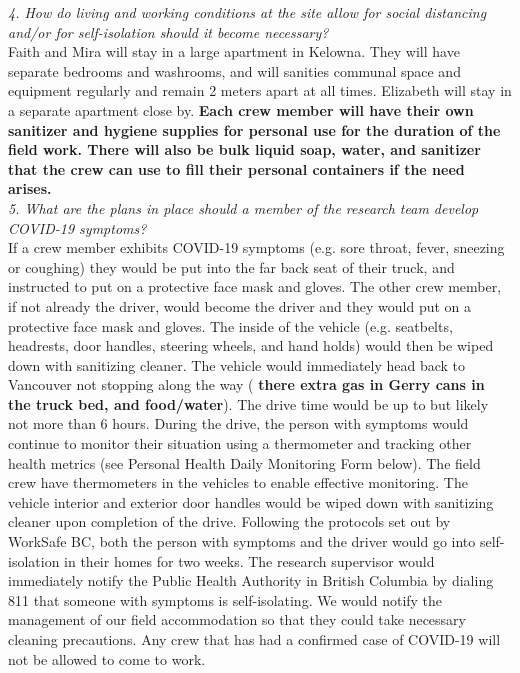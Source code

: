 \documentclass[11pt,letter]{article}
\begin{document}
\emph{4. How do living and working conditions at the site allow for social distancing and/or for self-isolation should it become necessary?}\\
Faith and Mira will stay in a large apartment in Kelowna. They will have separate bedrooms and washrooms, and will sanities communal space and equipment regularly and remain 2 meters apart at all times. Elizabeth will stay in a separate apartment close by.  \textbf{Each crew member will have their own sanitizer and hygiene supplies for personal use for the duration of the field work. There will also be bulk liquid soap, water, and sanitizer that the crew can use to fill their personal containers if the need arises.}\\

\emph{5. What are the plans in place should a member of the research team develop COVID-19 symptoms?}\\
If a crew member exhibits COVID-19 symptoms (e.g. sore throat, fever, sneezing or coughing) they would be put into the far back seat of their truck, and instructed to put on a protective face mask and gloves. The other crew member, if not already the driver, would become the driver and they would put on a protective face mask and gloves. The inside of the vehicle (e.g. seatbelts, headrests, door handles, steering wheels, and hand holds) would then be wiped down with sanitizing cleaner. The vehicle would immediately head back to Vancouver not stopping along the way ( \textbf{there extra gas in Gerry cans in the truck bed, and food/water}). The drive time would be up to but likely not more than 6 hours. During the drive, the person with symptoms would continue to monitor their situation using a thermometer and tracking other health metrics (see Personal Health Daily Monitoring Form below). The field crew have thermometers in the vehicles to enable effective monitoring. The vehicle interior and exterior door handles would be wiped down with sanitizing cleaner upon completion of the drive. Following the protocols set out by WorkSafe BC, both the person with symptoms and the driver would go into self-isolation in their homes for two weeks. The research supervisor would immediately notify the Public Health Authority in British Columbia by dialing 811 that someone with symptoms is self-isolating. We would notify the management of our field accommodation so that they could take necessary cleaning precautions.  Any crew that has had a confirmed case of COVID-19 will not be allowed to come to work.\\
\end{document}
